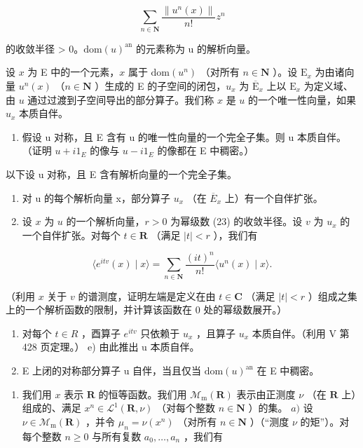 \[
\sum_ {n \in \mathbf {N}} \frac {\| u ^ {n} (x) \|}{n !} z ^ {n}\tag{23}
\]

的收敛半径 \textgreater{} 0。\(\text{dom}(u)^{\text{an}}\) 的元素称为 u 的解析向量。

设 \(x\) 为 E 中的一个元素，\(x\) 属于 \(\mathrm{dom}(u^n)\) （对所有 \(n \in \mathbf{N}\) ）。设 \(\mathrm{E}_x\) 为由诸向量 \(u^n(x)\) （\(n \in \mathbf{N}\) ）生成的 E 的子空间的闭包，\(u_x\) 为 \(\overline{\mathrm{E}}_x\) 上以 \(\mathrm{E}_x\) 为定义域、由 \(u\) 通过过渡到子空间导出的部分算子。我们称 \(x\) 是 \(u\) 的一个唯一性向量，如果 \(u_x\) 本质自伴。

\begin{enumerate}
\def\labelenumi{\alph{enumi})}
\tightlist
\item
  假设 u 对称，且 E 含有 u 的唯一性向量的一个完全子集。则 u 本质自伴。（证明 \(u + i1_{E}\) 的像与 \(u - i1_{E}\) 的像都在 E 中稠密。）
\end{enumerate}

以下设 u 对称，且 E 含有解析向量的一个完全子集。

\begin{enumerate}
\def\labelenumi{\alph{enumi})}
\setcounter{enumi}{1}
\item
  对 u 的每个解析向量 x，部分算子 \(u_{x}\) （在 \(\overline{E}_{x}\) 上）有一个自伴扩张。
\item
  设 \(x\) 为 \(u\) 的一个解析向量，\(r > 0\) 为幂级数 (23) 的收敛半径。设 \(v\) 为 \(u_x\) 的一个自伴扩张。对每个 \(t \in \mathbf{R}\) （满足 \(|t| < r\) ），我们有
\end{enumerate}

\[
\langle e ^ {i t v} (x) \mid x \rangle = \sum_ {n \in \mathbf {N}} \frac {(i t) ^ {n}}{n !} \langle u ^ {n} (x) \mid x \rangle .
\]

（利用 \(x\) 关于 \(v\) 的谱测度，证明左端是定义在由 \(t \in \mathbf{C}\) （满足 \(|t| < r\) ）组成之集上的一个解析函数的限制，并计算该函数在 0 处的幂级数展开。）

\begin{enumerate}
\def\labelenumi{\alph{enumi})}
\setcounter{enumi}{3}
\item
  对每个 \(t \in R\) ，酉算子 \(e^{itv}\) 只依赖于 \(u_x\) ，且算子 \(u_x\) 本质自伴。（利用 V 第 428 页定理。） e) 由此推出 u 本质自伴。
\item
  E 上闭的对称部分算子 u 自伴，当且仅当 \(\text{dom}(u)^{\text{an}}\) 在 E 中稠密。
\end{enumerate}

\begin{enumerate}
\def\labelenumi{\arabic{enumi})}
\setcounter{enumi}{20}
\tightlist
\item
  我们用 \(x\) 表示 \(\mathbf{R}\) 的恒等函数。我们用 \(\mathcal{M}_{\mathrm{m}}(\mathbf{R})\) 表示由正测度 \(\nu\) （在 \(\mathbf{R}\) 上）组成的、满足 \(x^n \in \mathcal{L}^1(\mathbf{R}, \nu)\) （对每个整数 \(n \in \mathbf{N}\) ）的集。 \(a)\) 设 \(\nu \in \mathcal{M}_{\mathrm{m}}(\mathbf{R})\) ，并令 \(\mu_n = \nu(x^n)\) （对所有 \(n \in \mathbf{N}\) ）（“测度 \(\nu\) 的矩”）。对每个整数 \(n \geqslant 0\) 与所有复数 \(a_0, \ldots, a_n\) ，我们有
\end{enumerate}

